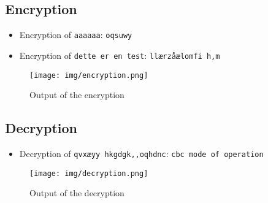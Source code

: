 \documentclass{article}
\begin{document}
\subsection{Encryption}
\begin{itemize}
    \item Encryption of \texttt{aaaaaa}: \texttt{oqsuwy}

    \item Encryption of \texttt{dette er en test}: \texttt{llærzåælomfi h,m}
\end{itemize}

\begin{figure}[H]
    \centering
    \texttt{[image: img/encryption.png]}
    \caption{Output of the encryption}
    \label{fig:encryption}
\end{figure}


\subsection{Decryption}
\begin{itemize}
    \item Decryption of \texttt{qvxæyy hkgdgk,,oqhdnc}: \texttt{cbc mode of operation}
\end{itemize}

\begin{figure}[H]
    \centering
    \texttt{[image: img/decryption.png]}
    \caption{Output of the decryption}
    \label{fig:decryption}
\end{figure}
\end{document}
